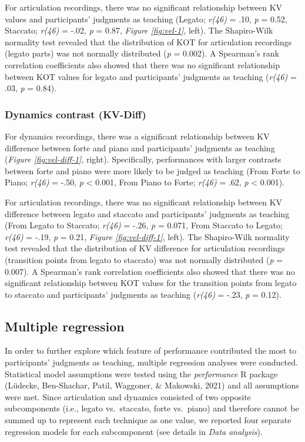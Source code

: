 \documentclass[
  man,floatsintext]{apa6}
\begin{document}
For articulation recordings, there was no significant relationship between KV values and participants' judgments as teaching (Legato; \emph{r(46)} = .10, \emph{p} = 0.52, Staccato; \emph{r(46)} = -.02, \emph{p} = 0.87, \emph{Figure \ref{fig:vel-1}}, left). The Shapiro-Wilk normality test revealed that the distribution of KOT for articulation recordings (legato parts) was not normally distributed (\emph{p} = 0.002). A Spearman's rank correlation coefficients also showed that there was no significant relationship between KOT values for legato and participants' judgments as teaching (\emph{r(46)} = .03, \emph{p} = 0.84).

\hypertarget{dynamics-contrast-kv-diff}{%
\subsubsection{Dynamics contrast (KV-Diff)}\label{dynamics-contrast-kv-diff}}

For dynamics recordings, there was a significant relationship between KV difference between forte and piano and participants' judgments as teaching (\emph{Figure \ref{fig:vel-diff-1}}, right). Specifically, performances with larger contrasts between forte and piano were more likely to be judged as teaching (From Forte to Piano; \emph{r(46)} = -.50, \emph{p} \textless{} 0.001, From Piano to Forte; \emph{r(46)} = .62, \emph{p} \textless{} 0.001).

For articulation recordings, there was no significant relationship between KV difference between legato and staccato and participants' judgments as teaching (From Legato to Staccato; \emph{r(46)} = -.26, \emph{p} = 0.071, From Staccato to Legato; \emph{r(46)} = -.19, \emph{p} = 0.21, \emph{Figure \ref{fig:vel-diff-1}}, left). The Shapiro-Wilk normality test revealed that the distribution of KV difference for articulation recordings (transition points from legato to staccato) was not normally distributed (\emph{p} = 0.007). A Spearman's rank correlation coefficients also showed that there was no significant relationship between KOT values for the transition points from legato to staccato and participants' judgments as teaching (\emph{r(46)} = -.23, \emph{p} = 0.12).

\hypertarget{multiple-regression}{%
\subsection{Multiple regression}\label{multiple-regression}}

In order to further explore which feature of performance contributed the most to participants' judgments as teaching, multiple regression analyses were conducted. Statistical model assumptions were tested using the \emph{performance} R package (Lüdecke, Ben-Shachar, Patil, Waggoner, \& Makowski, 2021) and all assumptions were met. Since articulation and dynamics consisted of two opposite subcomponents (i.e., legato vs.~staccato, forte vs.~piano) and therefore cannot be summed up to represent each technique as one value, we reported four separate regression models for each subcomponent (see details in \emph{Data analysis}).
\end{document}
